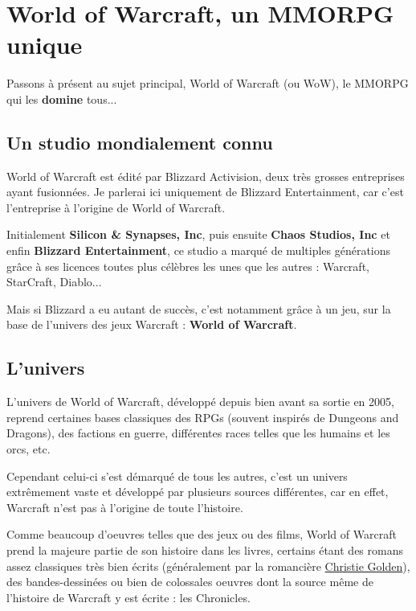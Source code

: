 \documentclass{article}
\begin{document}
\pagebreak

\section{World of Warcraft, un MMORPG unique}

Passons à présent au sujet principal, World of Warcraft (ou WoW), le MMORPG qui les
    {\large \textbf{domine}} tous...

\subsection{Un studio mondialement connu}

World of Warcraft est édité par Blizzard Activision, deux très grosses entreprises ayant
fusionnées. Je parlerai ici uniquement de Blizzard Entertainment, car c'est
l'entreprise à l'origine de World of Warcraft.

Initialement \textbf{Silicon \& Synapses, Inc}, puis ensuite \textbf{Chaos Studios, Inc}
et enfin \textbf{Blizzard Entertainment}, ce studio a marqué de multiples générations grâce
à ses licences toutes plus célèbres les unes que les autres : Warcraft, StarCraft, Diablo...

Mais si Blizzard a eu autant de succès, c'est notamment grâce à un jeu, sur la base de
l'univers des jeux Warcraft : \textbf{World of Warcraft}.

\subsection{L'univers}

L'univers de World of Warcraft, développé depuis bien avant sa sortie en 2005, reprend
certaines bases classiques des RPGs (souvent inspirés de Dungeons and Dragons),
des factions en guerre, différentes races telles que les humains et les orcs, etc.

Cependant celui-ci s'est démarqué de tous les autres, c'est un univers extrêmement vaste et
développé par plusieurs sources différentes, car en effet, Warcraft n'est pas à l'origine de
toute l'histoire.

Comme beaucoup d'oeuvres telles que des jeux ou des films, World of Warcraft prend la
majeure partie de son histoire dans les livres, certains étant des romans assez classiques
très bien écrits (généralement par la romancière
\href{https://fr.wikipedia.org/wiki/Christie_Golden}{Christie Golden}), des bandes-dessinées
ou bien de colossales oeuvres dont la source même de l'histoire de Warcraft y est écrite :
les Chronicles. \cite{chronicles-v1}\cite{chronicles-v2}\cite{chronicles-v3}
\end{document}
